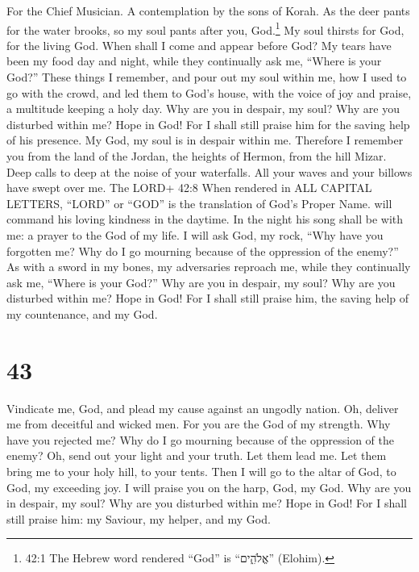 For the Chief Musician. A contemplation by the sons of Korah.
 As the deer pants for the water brooks, so my soul pants
after you, God.\footnote{42:1 The Hebrew word rendered ``God'' is
  ``אֱלֹהִ֑ים'' (Elohim).}  My soul thirsts for God, for the
living God. When shall I come and appear before God?  My
tears have been my food day and night, while they continually ask me,
``Where is your God?''  These things I remember, and pour
out my soul within me, how I used to go with the crowd, and led them to
God's house, with the voice of joy and praise, a multitude keeping a
holy day.  Why are you in despair, my soul? Why are you
disturbed within me? Hope in God! For I shall still praise him for the
saving help of his presence.  My God, my soul is in despair
within me. Therefore I remember you from the land of the Jordan, the
heights of Hermon, from the hill Mizar.  Deep calls to deep
at the noise of your waterfalls. All your waves and your billows have
swept over me.  The LORD+ 42:8 When rendered in ALL CAPITAL
LETTERS, ``LORD'' or ``GOD'' is the translation of God's Proper Name.
will command his loving kindness in the daytime. In the night his song
shall be with me: a prayer to the God of my life.  I will
ask God, my rock, ``Why have you forgotten me? Why do I go mourning
because of the oppression of the enemy?''  As with a sword
in my bones, my adversaries reproach me, while they continually ask me,
``Where is your God?''  Why are you in despair, my soul?
Why are you disturbed within me? Hope in God! For I shall still praise
him, the saving help of my countenance, and my God.

\hypertarget{section-42}{%
\section{43}\label{section-42}}

 Vindicate me, God, and plead my cause against an ungodly
nation. Oh, deliver me from deceitful and wicked men.  For
you are the God of my strength. Why have you rejected me? Why do I go
mourning because of the oppression of the enemy?  Oh, send
out your light and your truth. Let them lead me. Let them bring me to
your holy hill, to your tents.  Then I will go to the altar
of God, to God, my exceeding joy. I will praise you on the harp, God, my
God.  Why are you in despair, my soul? Why are you disturbed
within me? Hope in God! For I shall still praise him: my Saviour, my
helper, and my God.

